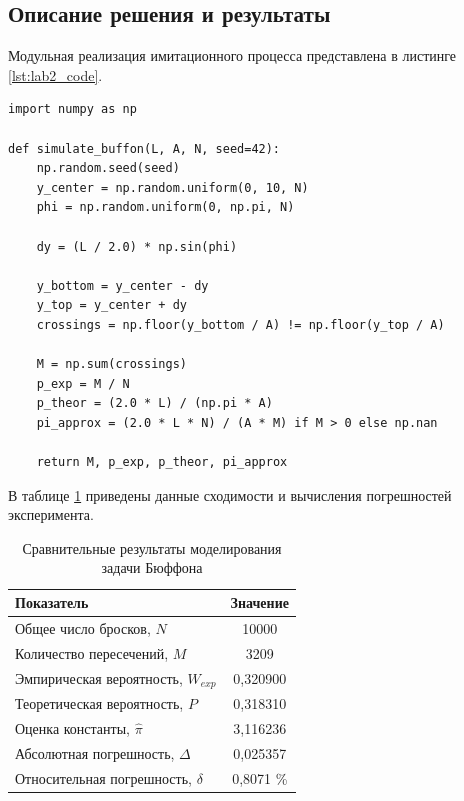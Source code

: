 \documentclass[a4paper,14pt]{extarticle}
\begin{document}
\subsection{Описание решения и результаты}
Модульная реализация имитационного процесса представлена в листинге \ref{lst:lab2_code}.

\begin{lstlisting}[caption={Имитационное моделирование задачи Бюффона}, label={lst:lab2_code}]
import numpy as np

def simulate_buffon(L, A, N, seed=42):
    np.random.seed(seed)
    y_center = np.random.uniform(0, 10, N)
    phi = np.random.uniform(0, np.pi, N)

    dy = (L / 2.0) * np.sin(phi)
    
    y_bottom = y_center - dy
    y_top = y_center + dy
    crossings = np.floor(y_bottom / A) != np.floor(y_top / A)

    M = np.sum(crossings)
    p_exp = M / N
    p_theor = (2.0 * L) / (np.pi * A)
    pi_approx = (2.0 * L * N) / (A * M) if M > 0 else np.nan

    return M, p_exp, p_theor, pi_approx
\end{lstlisting}

В таблице \ref{tab:lab2_res} приведены данные сходимости и вычисления погрешностей эксперимента.

\begin{table}[H]
    \centering
    \caption{Сравнительные результаты моделирования задачи Бюффона}
    \label{tab:lab2_res}
    \begin{tabular}{lc}
        \toprule
        \textbf{Показатель} & \textbf{Значение} \\
        \midrule
        Общее число бросков, $N$ & 10000 \\
        Количество пересечений, $M$ & 3209 \\
        Эмпирическая вероятность, $W_{exp}$ & 0,320900 \\
        Теоретическая вероятность, $P$ & 0,318310 \\
        Оценка константы, $\hat{\pi}$ & 3,116236 \\
        Абсолютная погрешность, $\Delta$ & 0,025357 \\
        Относительная погрешность, $\delta$ & 0,8071 \% \\
        \bottomrule
    \end{tabular}
\end{table}


\end{document}
